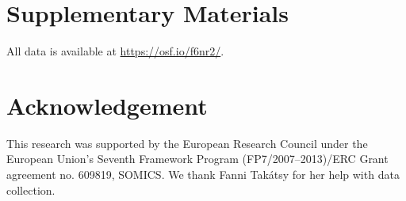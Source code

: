 \documentclass[
  man,floatsintext]{apa6}
\begin{document}
\hypertarget{supplementary-materials}{%
\section{Supplementary Materials}\label{supplementary-materials}}

All data is available at \url{https://osf.io/f6nr2/}.

\hypertarget{acknowledgement}{%
\section{Acknowledgement}\label{acknowledgement}}

This research was supported by the European Research Council under the European Union's Seventh Framework Program (FP7/2007--2013)/ERC Grant agreement no. 609819, SOMICS. We thank Fanni Takátsy for her help with data collection.
\end{document}
